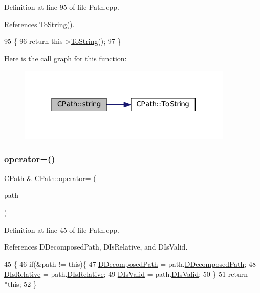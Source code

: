 Definition at line 95 of file Path.\+cpp.



References To\+String().


\begin{DoxyCode}
95                                \{
96     \textcolor{keywordflow}{return} this->\hyperlink{classCPath_abbafaf377a7e38e0151bd9567d526951}{ToString}();
97 \}
\end{DoxyCode}
Here is the call graph for this function\+:\nopagebreak
\begin{figure}[H]
\begin{center}
\leavevmode
\includegraphics[width=290pt]{classCPath_a8fade0e7a418c92d5f68ac8872dda8b1_cgraph}
\end{center}
\end{figure}
\hypertarget{classCPath_a6f3121638129c293fca7bbeecd8b0ad3}{}\label{classCPath_a6f3121638129c293fca7bbeecd8b0ad3} 
\subsubsection{\texorpdfstring{operator=()}{operator=()}}
{\footnotesize\ttfamily \hyperlink{classCPath}{C\+Path} \& C\+Path\+::operator= (\begin{DoxyParamCaption}\item[{const \hyperlink{classCPath}{C\+Path} \&}]{path }\end{DoxyParamCaption})}



Definition at line 45 of file Path.\+cpp.



References D\+Decomposed\+Path, D\+Is\+Relative, and D\+Is\+Valid.


\begin{DoxyCode}
45                                         \{
46     \textcolor{keywordflow}{if}(&path != \textcolor{keyword}{this})\{
47         \hyperlink{classCPath_a03ed25209a01e633c107a0c877fc61f8}{DDecomposedPath} = path.\hyperlink{classCPath_a03ed25209a01e633c107a0c877fc61f8}{DDecomposedPath};
48         \hyperlink{classCPath_af705ff149bb2281c67afb84fff550eb9}{DIsRelative} = path.\hyperlink{classCPath_af705ff149bb2281c67afb84fff550eb9}{DIsRelative};
49         \hyperlink{classCPath_a992aca27a1cba1c3bae3d04438821192}{DIsValid} = path.\hyperlink{classCPath_a992aca27a1cba1c3bae3d04438821192}{DIsValid};
50     \}
51     \textcolor{keywordflow}{return} *\textcolor{keyword}{this};
52 \}
\end{DoxyCode}
\hypertarget{classCPath_aaf49ee9d0f8ed1ffa6bb5e18aba86b4f}{}\label{classCPath_aaf49ee9d0f8ed1ffa6bb5e18aba86b4f} 
